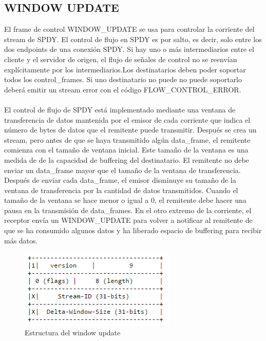 \subsection{WINDOW UPDATE}
El frame de control WINDOW\_UPDATE se usa para controlar la corriente del stream de SPDY.  El control de flujo en SPDY es por salto, es decir, solo entre los dos endpoints de una conexión SPDY. Si hay uno o más intermediarios entre el cliente y el servidor de origen, el flujo de señales de control no se reenvían explícitamente por los intermediarios.Los destinatarios deben poder soportar todos los control\_frames. Si uno destinatario no puede no puede soportarlo deberá emitir un stream error con el código FLOW\_CONTROL\_ERROR.
\\
\\
El control de flujo de SPDY está implementado mediante una ventana de transferencia de datos mantenida por el emisor de cada corriente que indica el número de bytes de datos que el remitente puede transmitir. Después se crea un stream, pero antes de que se haya transmitido algún data\_frame, el remitente comienza con el tamaño de ventana inicial.  Este tamaño de la ventana es una medida de de la capacidad de buffering del destinatario. El remitente no debe enviar un data\_frame mayor que el tamaño de la ventana de transferencia. Después de enviar cada data\_frame, el emisor disminuye su tamaño de la ventana de transferencia por la cantidad de datos transmitidos. Cuando el tamaño de la ventana se hace menor o igual a 0, el remitente debe hacer una pausa en la transmisión de data\_frames. En el otro extremo de la corriente, el receptor envía un WINDOW\_UPDATE para volver a notificar al remitente de que se ha consumido algunos datos y ha liberado espacio de buffering para recibir más datos.
\\
\begin{figure}[H] %
\includegraphics[scale=1]{windowupdate.png}  %
\centering
\caption{Estructura del window update} \label{fig:figura11}
\end{figure}

